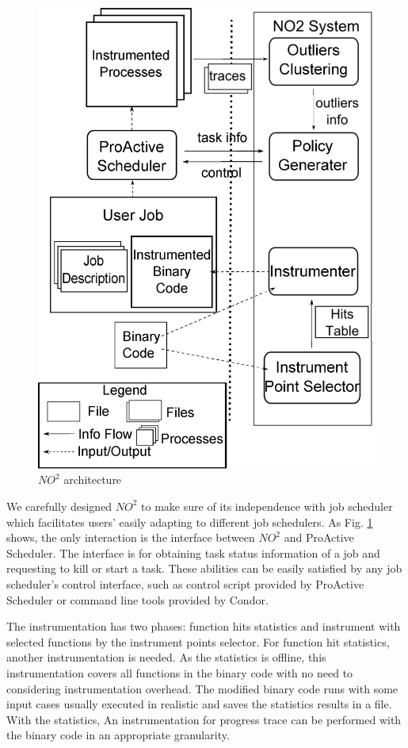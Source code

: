\begin{figure}
\centering
\includegraphics[width=0.9\columnwidth]{figures/NO2_arch.eps}
\caption{$NO^2$ architecture}
\label{figure:no2arch}
\end{figure}

We carefully designed $NO^2$ to make sure of its independence with job scheduler which
facilitates users' easily adapting to different job schedulers. As Fig.
\ref{figure:no2arch} shows, the only interaction is the interface between $NO^2$ and
ProActive Scheduler. The interface is for obtaining task status information of a job and
requesting to kill or start a task. These abilities can be easily satisfied by any job
scheduler's control interface, such as control script provided by ProActive Scheduler or
command line tools provided by Condor.

The instrumentation has two phases: function hits statistics and instrument with selected
functions by the instrument points selector. For function hit statistics, another
instrumentation is needed. As the statistics is offline, this instrumentation covers all
functions in the binary code with no need to considering instrumentation overhead. The
modified binary code runs with some input cases usually executed in realistic and saves
the statistics results in a file. With the statistics, An instrumentation for progress
trace can be performed with the binary code in an appropriate granularity.

